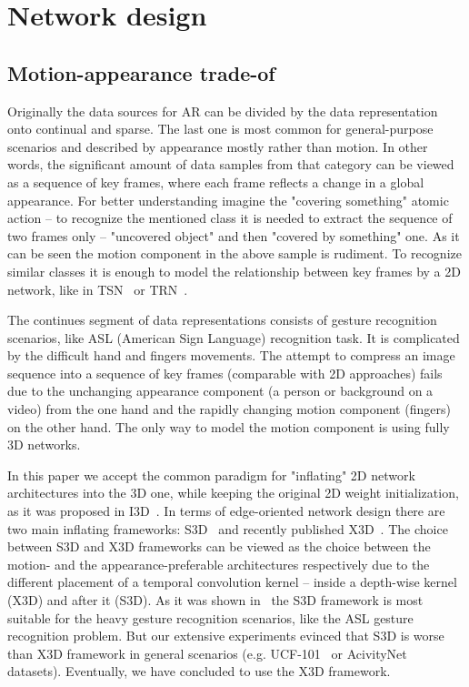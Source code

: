 \documentclass[twoside, twocolumn]{article}
\begin{document}
\section{Network design}

\subsection{Motion-appearance trade-of}

\lettrine[nindent=0em,lines=3]{O}{}riginally the data sources for AR can be divided by the data representation onto
continual and sparse. The last one is most common for general-purpose scenarios and described by appearance mostly
rather than motion. In other words, the significant amount of data samples from that category can be viewed as a
sequence of key frames, where each frame reflects a change in a global appearance. For better understanding imagine the
"covering something" atomic action -- to recognize the mentioned class it is needed to extract the sequence of two
frames only -- "uncovered object" and then "covered by something" one. As it can be seen the motion component in the
above sample is rudiment. To recognize similar classes it is enough to model the relationship between key frames by a 2D
network, like in TSN~\cite{TSN} or TRN~\cite{TRN}.

The continues segment of data representations consists of gesture recognition scenarios, like ASL (American Sign
Language) recognition task. It is complicated by the difficult hand and fingers movements. The attempt to compress an
image sequence into a sequence of key frames (comparable with 2D approaches) fails~\cite{MSASL} due to the unchanging
appearance component (a person or background on a video) from the one hand and the rapidly changing motion component 
(fingers) on the other hand. The only way to model the motion component is using fully 3D networks.

In this paper we accept the common paradigm for "inflating" 2D network architectures into the 3D one, while keeping the
original 2D weight initialization, as it was proposed in I3D~\cite{I3D}. In terms of edge-oriented network design there
are two main inflating frameworks: S3D~\cite{S3D} and recently published X3D~\cite{X3D}. The choice between S3D and X3D
frameworks can be viewed as the choice between the motion- and the appearance-preferable architectures respectively due
to the different placement of a temporal convolution kernel -- inside a depth-wise kernel (X3D) and after it (S3D). As
it was shown in~\cite{ASLNet} the S3D framework is most suitable for the heavy gesture recognition scenarios, like the
ASL gesture recognition problem. But our extensive experiments evinced that S3D is worse than X3D framework in general
scenarios (e.g. UCF-101~\cite{UCF101} or AcivityNet~\cite{ActivityNet} datasets). Eventually, we have concluded to use
the X3D framework.
\end{document}
